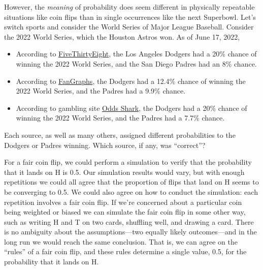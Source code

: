 \documentclass[
  letterpaper,
  DIV=11,
  numbers=noendperiod]{scrreprt}
\providecommand{\tightlist}{%
  \setlength{\itemsep}{0pt}\setlength{\parskip}{0pt}}
\theoremstyle{plain}
\theoremstyle{definition}
\theoremstyle{definition}
\theoremstyle{definition}
\theoremstyle{remark}
\begin{document}
However, the \emph{meaning} of probability does seem different in
physically repeatable situations like coin flips than in single
occurrences like the next Superbowl. Let's switch sports and consider
the World Series of Major League Baseball. Consider the 2022 World
Series, which the Houston Astros won. As of June 17, 2022,

\begin{itemize}
\tightlist
\item
  According to
  \href{https://projects.fivethirtyeight.com/2022-mlb-predictions/}{FiveThirtyEight},
  the Los Angeles Dodgers had a 20\% chance of winning the 2022 World
  Series, and the San Diego Padres had an 8\% chance.
\item
  According to
  \href{https://www.fangraphs.com/standings/playoff-odds/fg/mlb}{FanGraphs},
  the Dodgers had a 12.4\% chance of winning the 2022 World Series, and
  the Padres had a 9.9\% chance.
\item
  According to gambling site
  \href{https://www.oddsshark.com/mlb/world-series-odds}{Odds Shark},
  the Dodgers had a 20\% chance of winning the 2022 World Series, and
  the Padres had a 7.7\% chance.
\end{itemize}

Each source, as well as many others, assigned different probabilities to
the Dodgers or Padres winning. Which source, if any, was ``correct''?

For a fair coin flip, we could perform a simulation to verify that the
probability that it lands on H is 0.5. Our simulation results would
vary, but with enough repetitions we could all agree that the proportion
of flips that land on H seems to be converging to 0.5. We could also
agree on how to conduct the simulation: each repetition involves a fair
coin flip. If we're concerned about a particular coin being weighted or
biased we can simulate the fair coin flip in some other way, such as
writing H and T on two cards, shuffling well, and drawing a card. There
is no ambiguity about the assumptions---two equally likely
outcomes---and in the long run we would reach the same conclusion. That
is, we can agree on the ``rules'' of a fair coin flip, and these rules
determine a single value, 0.5, for the probability that it lands on H.
\end{document}
